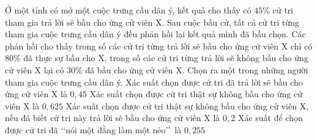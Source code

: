 \begin{ex}%
	Ở một tỉnh có mở một cuộc trưng cầu dân ý, kết quả cho thấy có $45\%$ cử tri tham gia trả lời sẽ bầu cho ứng cử viên X. Sau cuộc bầu cử, tất cả cử tri từng tham gia cuộc trưng cầu dân ý đều phản hồi lại kết quả mình đã bầu chọn. Các phản hồi cho thấy trong số các cử tri từng trả lời sẽ bầu cho ứng cử viên X chỉ có $80\%$ đã thực sự bầu cho X, trong số các cử tri từng trả lời sẽ không bầu cho ứng cử viên X lại có $30\%$ đã bầu cho ứng cử viên X. Chọn ra một trong những người tham gia cuộc trưng cầu dân ý.
	\choiceTF
	{\True Xác suất chọn được cử tri đã trả lời sẽ bầu cho ứng cử viên X là $0{,}45$}
	{Xác suất chọn được cử tri thật sự không bầu cho ứng cử viên X là $0{,}625$}
	{\True Xác suất chọn được cử tri thật sự không bầu cho ứng cử viên X, nếu đã biết cử tri này trả lời sẽ bầu cho ứng cử viên X là $0{,}2$}
	{\True Xác suất để chọn được cử tri đã \lq\lq nói một đằng làm một nẻo\rq\rq \ là $0{,}255$}
\end{ex}
